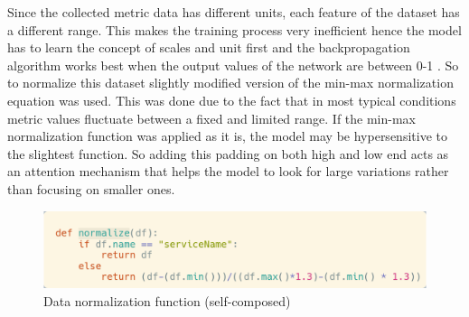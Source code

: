Since the collected metric data has different units, each feature of the dataset has a different range. This makes the training process very inefficient hence the model has to learn the concept of scales and unit first and the backpropagation algorithm works best when the output values of the network are between 0-1 \citep{sola1997importance}. So to normalize this dataset slightly modified version of the min-max normalization equation was used. This was done due to the fact that in most typical conditions metric values fluctuate between a fixed and limited range. If the min-max normalization function was applied as it is, the model may be hypersensitive to the slightest function. So adding this padding on both high and low end acts as an attention mechanism that helps the model to look for large variations rather than focusing on smaller ones.

\begin{figure}[H]
    \includegraphics[width=12cm]{assets/implementation/normalize-data.png}
    \caption{Data normalization function (self-composed)}
    \label{fig:normalize-data}
\end{figure}


